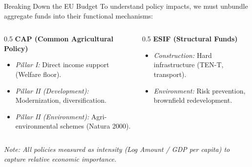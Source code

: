 \documentclass[aspectratio=169]{beamer}
\begin{document}
\begin{frame}{Breaking Down the EU Budget}
    To understand policy impacts, we must unbundle aggregate funds into their functional mechanisms:
    \vspace{0.5cm}
    \begin{columns}
        \begin{column}{0.5\textwidth}
            \textbf{CAP (Common Agricultural Policy)}
            \begin{itemize}
                \item \textit{Pillar I:} Direct income support (Welfare floor).
                \item \textit{Pillar II (Development):} Modernization, diversification.
                \item \textit{Pillar II (Environment):} Agri-environmental schemes (Natura 2000).
            \end{itemize}
        \end{column}
        \begin{column}{0.5\textwidth}
            \textbf{ESIF (Structural Funds)}
            \begin{itemize}
                \item \textit{Construction:} Hard infrastructure (TEN-T, transport).
                \item \textit{Environment:} Risk prevention, brownfield redevelopment.
            \end{itemize}
        \end{column}
    \end{columns}
    \vspace{0.5cm}
    \textit{Note: All policies measured as intensity (Log Amount / GDP per capita) to capture relative economic importance.}
\end{frame}
\end{document}
